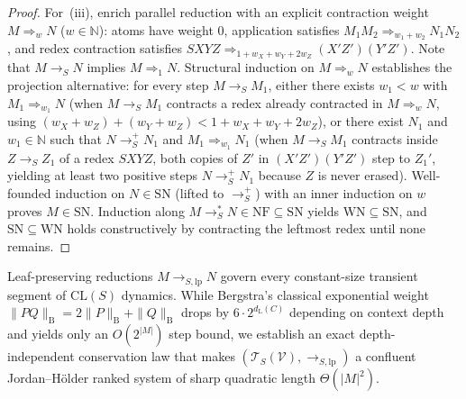 \documentclass[11pt,reqno]{amsart}
\numberwithin{equation}{section}
\theoremstyle{plain}
\theoremstyle{definition}
\theoremstyle{remark}
\newcommand{\CLS}{\mathrm{CL}(S)}
\newcommand{\TSV}{\mathcal{T}_S(\mathcal{V})}
\newcommand{\NF}{\mathrm{NF}}
\newcommand{\SN}{\mathrm{SN}}
\newcommand{\WN}{\mathrm{WN}}
\newcommand{\redS}{\to_S}
\newcommand{\redSp}{\to_S^+}
\newcommand{\redSs}{\to_S^*}
\begin{document}
\begin{proof}
For~(iii), enrich parallel reduction with an explicit contraction weight $M \Rightarrow_w N$ ($w \in \mathbb{N}$): atoms have weight $0$, application satisfies $M_1 M_2 \Rightarrow_{w_1 + w_2} N_1 N_2$, and redex contraction satisfies $S X Y Z \Rightarrow_{1 + w_X + w_Y + 2 w_Z} (X' Z')(Y' Z')$. Note that $M \redS N$ implies $M \Rightarrow_1 N$. Structural induction on $M \Rightarrow_w N$ establishes the projection alternative: for every step $M \redS M_1$, either there exists $w_1 < w$ with $M_1 \Rightarrow_{w_1} N$ (when $M \redS M_1$ contracts a redex already contracted in $M \Rightarrow_w N$, using $(w_X + w_Z) + (w_Y + w_Z) < 1 + w_X + w_Y + 2 w_Z$), or there exist $N_1$ and $w_1 \in \mathbb{N}$ such that $N \redSp N_1$ and $M_1 \Rightarrow_{w_1} N_1$ (when $M \redS M_1$ contracts inside $Z \redS Z_1$ of a redex $S X Y Z$, both copies of $Z'$ in $(X' Z')(Y' Z')$ step to $Z_1'$, yielding at least two positive steps $N \redSp N_1$ because $Z$ is never erased). Well-founded induction on $N \in \SN$ (lifted to $\redSp$) with an inner induction on $w$ proves $M \in \SN$. Induction along $M \redSs N \in \NF \subseteq \SN$ yields $\WN \subseteq \SN$, and $\SN \subseteq \WN$ holds constructively by contracting the leftmost redex until none remains.
\end{proof}

Leaf-preserving reductions $M \to_{S,\mathrm{lp}} N$ govern every constant-size transient segment of $\CLS$ dynamics. While Bergstra's classical exponential weight $\|P Q\|_{\mathrm{B}} = 2\|P\|_{\mathrm{B}} + \|Q\|_{\mathrm{B}}$ \cite{KlopVanOostromVanRaamsdonk2007,BarendregtEndrullisKlopWaldmann2017} drops by $6 \cdot 2^{d_{\mathrm{L}}(C)}$ depending on context depth and yields only an $O(2^{|M|})$ step bound, we establish an exact depth-independent conservation law that makes $(\TSV, \to_{S,\mathrm{lp}})$ a confluent Jordan--H\"older ranked system of sharp quadratic length $\Theta(|M|^2)$.
\end{document}

